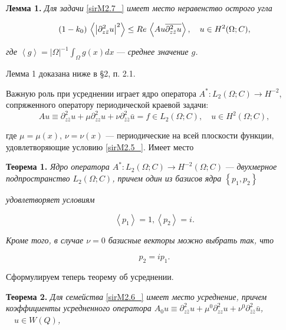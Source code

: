 \textbf{Лемма 1. }  \textit{Для задачи }\eqref{sirM2.7_}\textit{ имеет место неравенство острого угла}

\begin{equation}
\label{sirM2.8_}
(1-k_{0} ){\kern 1pt} {\kern 1pt} \left\langle \left|\partial _{z\bar{z}}^{2} u\right|^{2} \right\rangle \le Re\, \left\langle Au\overline{\partial _{z\bar{z}}^{2} u}\right\rangle ,\quad u\in H^{2} (\Omega ;C),
\end{equation}

\textit{где $\left\langle g\right\rangle =\left|\Omega \right|^{-1} \int _{\Omega }g(x)dx $ }---\textit{ среднее значение $g$.}

Лемма 1  доказана ниже в  \S 2,  п. 2.1.

Важную роль при усреднении играет ядро оператора  $A^{*} :L_{2} (\Omega ;C)\to H^{-2} $, сопряженного оператору периодической краевой задачи:
\begin{equation}
Au\equiv \partial _{z\bar{z}}^{2} u+\mu \partial _{zz}^{2} u+\nu \partial _{\bar{z}\bar{z}}^{2} \bar{u}=f\in L_{2} (\Omega ;C),\quad u\in H^{2} (\Omega ;C),
\label{sirM2.9_}
\end{equation}

где $\mu =\mu (x)$, $\nu =\nu (x)$ --- периодические на всей плоскости функции, удовлетворяющие условию \eqref{sirM2.5_}.  Имеет место

\textbf{Теорема 1. }\textit{Ядро оператора $A^{*} :L_{2} (\Omega ;C)\to H^{-2} (\Omega ;C)$ }---\textit{ двухмерное подпространство   $L_{2} (\Omega ;C)$,   причем  один   из   базисов   ядра  $\left\{p_{1} ,p_{2} \right\}$ }

\textit{удовлетворяет  условиям  }

\begin{equation}
\label{sirM2.10_}
\left\langle p_{1} \right\rangle =1, \left\langle p_{2} \right\rangle =i.
\end{equation}

\textit{Кроме того, в случае $\nu =0$  базисные векторы можно выбрать так, что }

\begin{equation}
\label{sirM2.11_}
p_{2} =ip_{1}.
\end{equation}

    Сформулируем теперь теорему об усреднении.

\textbf{Теорема 2. }\textit{Для семейства }\eqref{sirM2.6_}\textit{ имеет место усреднение, причем коэффициенты усредненного оператора   $A_{0} u\equiv \partial _{z\bar{z}}^{2} u+\mu ^{0} \partial _{zz}^{2} u+\nu ^{0} \partial _{\bar{z}\bar{z}}^{2} \bar{u}$, $\quad u\in W(Q)$,}

